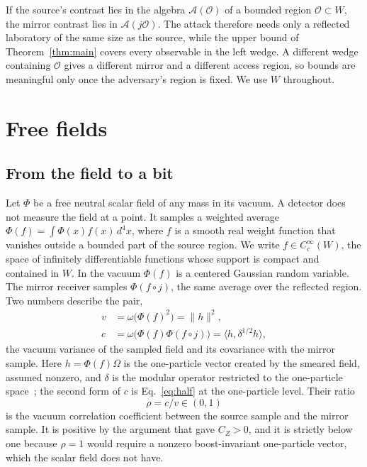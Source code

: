 \documentclass[11pt,a4paper]{article}
\newcommand{\A}{\mathcal A}
\newcommand{\Oreg}{\mathcal O}
\begin{document}
If the source's contrast lies in the algebra $\A(\Oreg)$ of a bounded region $\Oreg\subset W$, the mirror contrast lies in $\A(j\Oreg)$. The attack therefore needs only a reflected laboratory of the same size as the source, while the upper bound of Theorem~\ref{thm:main} covers every observable in the left wedge. A different wedge containing $\Oreg$ gives a different mirror and a different access region, so bounds are meaningful only once the adversary's region is fixed. We use $W$ throughout.

\section{Free fields}
\label{sec:free}

\subsection{From the field to a bit}

Let $\Phi$ be a free neutral scalar field of any mass in its vacuum. A detector does not measure the field at a point. It samples a weighted average $\Phi(f)=\int\Phi(x)f(x)\,d^4x$, where $f$ is a smooth real weight function that vanishes outside a bounded part of the source region. We write $f\in C_c^\infty(W)$, the space of infinitely differentiable functions whose support is compact and contained in $W$. In the vacuum $\Phi(f)$ is a centered Gaussian random variable. The mirror receiver samples $\Phi(f\circ j)$, the same average over the reflected region. Two numbers describe the pair,
\begin{equation}
\begin{aligned}
 v&=\omega\bigl(\Phi(f)^2\bigr)=\|h\|^2,\\
 c&=\omega\bigl(\Phi(f)\Phi(f\circ j)\bigr)=\langle h,\delta^{1/2}h\rangle ,
\end{aligned}
 \label{eq:vc}
\end{equation}
the vacuum variance of the sampled field and its covariance with the mirror sample. Here $h=\Phi(f)\Omega$ is the one-particle vector created by the smeared field, assumed nonzero, and $\delta$ is the modular operator restricted to the one-particle space~\cite{eckmann1973application}; the second form of $c$ is Eq.~\eqref{eq:half} at the one-particle level. Their ratio
\begin{equation*}
\rho=c/v\in(0,1)
\end{equation*}
is the vacuum correlation coefficient between the source sample and the mirror sample. It is positive by the argument that gave $C_Z>0$, and it is strictly below one because $\rho=1$ would require a nonzero boost-invariant one-particle vector, which the scalar field does not have.
\end{document}
